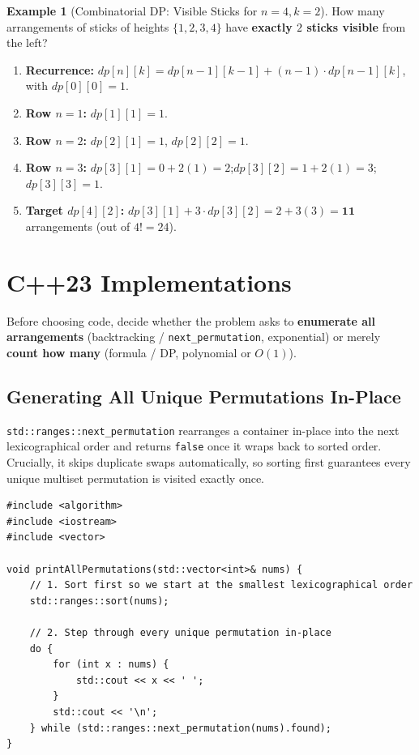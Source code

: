 \documentclass[11pt,a4paper]{article}
\theoremstyle{definition}
\newtheorem{example}{Example}[section]
\begin{document}
\begin{example}[Combinatorial DP: Visible Sticks for $n = 4, k = 2$]
How many arrangements of sticks of heights $\{1, 2, 3, 4\}$ have \textbf{exactly $2$ sticks visible} from the left?
\begin{enumerate}
    \item \textbf{Recurrence:} $dp[n][k] = dp[n - 1][k - 1] + (n - 1) \cdot dp[n - 1][k]$, with $dp[0][0] = 1$.
    \item \textbf{Row $n = 1$:} $dp[1][1] = 1$.
    \item \textbf{Row $n = 2$:} $dp[2][1] = 1$, $dp[2][2] = 1$.
    \item \textbf{Row $n = 3$:} $dp[3][1] = 0 + 2(1) = 2$;\quad $dp[3][2] = 1 + 2(1) = 3$;\quad $dp[3][3] = 1$.
    \item \textbf{Target $dp[4][2]$:} $dp[3][1] + 3 \cdot dp[3][2] = 2 + 3(3) = \mathbf{11}$ arrangements (out of $4! = 24$).
\end{enumerate}
\end{example}

\section{C++23 Implementations}

Before choosing code, decide whether the problem asks to \textbf{enumerate all arrangements} (backtracking / \texttt{next\_permutation}, exponential) or merely \textbf{count how many} (formula / DP, polynomial or $O(1)$).

\subsection{Generating All Unique Permutations In-Place}

\texttt{std::ranges::next\_permutation} rearranges a container in-place into the next lexicographical order and returns \texttt{false} once it wraps back to sorted order. Crucially, it skips duplicate swaps automatically, so sorting first guarantees every unique multiset permutation is visited exactly once.

\begin{lstlisting}[caption={Generating All Unique Permutations with C++20/23 Ranges}]
#include <algorithm>
#include <iostream>
#include <vector>

void printAllPermutations(std::vector<int>& nums) {
    // 1. Sort first so we start at the smallest lexicographical order
    std::ranges::sort(nums);

    // 2. Step through every unique permutation in-place
    do {
        for (int x : nums) {
            std::cout << x << ' ';
        }
        std::cout << '\n';
    } while (std::ranges::next_permutation(nums).found);
}
\end{lstlisting}
\end{document}
